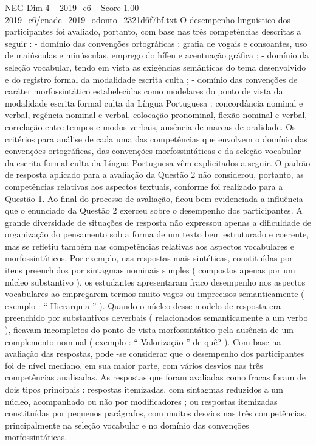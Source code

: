 \begin{textsample}{NEG Dim 4 – 2019\_c6 – Score 1.00 – 2019\_c6/enade\_2019\_odonto\_2321d6f7bf.txt}
O desempenho linguístico dos participantes foi avaliado, portanto, com base nas três competências descritas a seguir : - domínio das convenções ortográficas : grafia de vogais e consoantes, uso de maiúsculas e minúsculas, emprego do hífen e acentuação gráfica ; - domínio da seleção vocabular, tendo em vista as exigências semânticas do tema desenvolvido e do registro formal da modalidade escrita culta ; - domínio das convenções de caráter morfossintático estabelecidas como modelares do ponto de vista da modalidade escrita formal culta da Língua Portuguesa : concordância nominal e verbal, regência nominal e verbal, colocação pronominal, flexão nominal e verbal, correlação entre tempos e modos verbais, ausência de marcas de oralidade.
Os critérios para análise de cada uma das competências que envolvem o domínio das convenções ortográficas, das convenções morfossintáticas e da seleção vocabular da escrita formal culta da Língua Portuguesa vêm explicitados a seguir.
O padrão de resposta aplicado para a avaliação da Questão 2 não considerou, portanto, as competências relativas aos aspectos textuais, conforme foi realizado para a Questão 1.
Ao final do processo de avaliação, ficou bem evidenciada a influência que o enunciado da Questão 2 exerceu sobre o desempenho dos participantes.
A grande diversidade de situações de resposta não expressou apenas a dificuldade de organização do pensamento sob a forma de um texto bem estruturado e coerente, mas se refletiu também nas competências relativas aos aspectos vocabulares e morfossintáticos.
Por exemplo, nas respostas mais sintéticas, constituídas por itens preenchidos por sintagmas nominais simples ( compostos apenas por um núcleo substantivo ), os estudantes apresentaram fraco desempenho nos aspectos vocabulares ao empregarem termos muito vagos ou imprecisos semanticamente ( exemplo : “ Hierarquia ” ).
Quando o núcleo desse modelo de resposta era preenchido por substantivos deverbais ( relacionados semanticamente a um verbo ), ficavam incompletos do ponto de vista morfossintático pela ausência de um complemento nominal ( exemplo : “ Valorização ” de quê? ).
Com base na avaliação das respostas, pode -se considerar que o desempenho dos participantes foi de nível mediano, em sua maior parte, com vários desvios nas três competências analisadas.
As respostas que foram avaliadas como fracas foram de dois tipos principais : respostas itemizadas, com sintagmas reduzidos a um núcleo, acompanhado ou não por modificadores ; ou respostas itemizadas constituídas por pequenos parágrafos, com muitos desvios nas três competências, principalmente na seleção vocabular e no domínio das convenções morfossintáticas.

\end{textsample}
